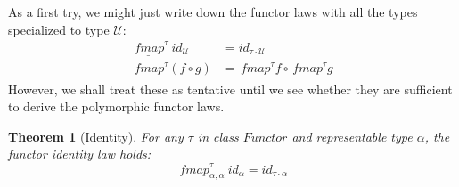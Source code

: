 \documentclass{sigplanconf}
\newcommand{\U}{\ensuremath{\mathcal{U}}}
\newcommand{\univ}[1]{\ensuremath{\underline{#1}}}
\newcommand{\hsc}[1]{\ensuremath{\mathit{#1}}}
\newcommand{\hsid}{\hsc{id}}
\newcommand{\fmap}{\,\hsc{fmap}} %
\newcommand{\fmapU}{\univ{\fmap}}
\newcommand{\tA}{\alpha}
\newcommand{\tT}{\tau}
\newtheorem{theorem}{Theorem}
\theoremstyle{definition}
\begin{document}
As a first try, we might just write down the functor laws with all the types specialized to type $\U$:
%
\begin{align}
\label{eq:fmapu-id}
\fmapU^\tT\:\hsid_\U &= \hsid_{\tT\cdot\U} \\
\label{eq:fmapu-compose}
\fmapU^\tT (f \circ g) &= \fmapU^\tT f \circ \fmapU^\tT g
\end{align}
%
However, we shall treat these as tentative until we see whether they are sufficient to derive the polymorphic functor laws.

\begin{theorem}[Identity]
\label{thm:functor-identity}
For any $\tT$ in class \hsc{Functor} and representable type $\tA$, the functor identity law holds:
\begin{equation*}
\fmap^\tT_{\tA,\tA}\:\hsid_\tA = \hsid_{\tT\cdot\tA}
\end{equation*}
\end{theorem}
\end{document}
